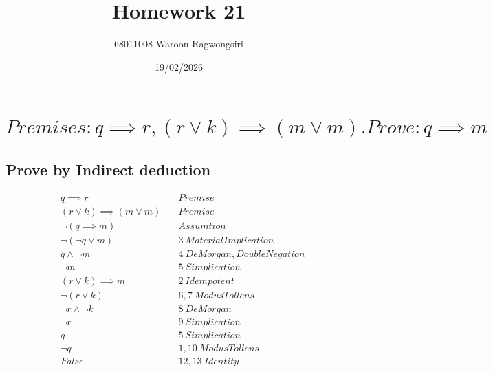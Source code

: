 \documentclass{article}
\title{Homework 21}
\author{68011008 Waroon Ragwongsiri}
\date{19/02/2026}
\begin{document}
\maketitle

{\small
\section{$Premises: q \implies r , (r \lor k) \implies (m \lor m). Prove: q \implies m$}
}
\subsection{Prove by Indirect deduction}
\begin{align}
	&q \implies r \quad & Premise \\
	&(r \lor k) \implies (m \lor m) \quad & Premise \\
	&\neg (q \implies m) \quad & Assumtion \\
	&\neg (\neg q \lor m) \quad & 3 \ Material Implication \\
	&q \land \neg m \quad & 4 \ De Morgan, Double Negation \\
	&\neg m \quad & 5 \ Simplication \\
	&(r \lor k) \implies m \quad & 2 \ Idempotent \\
	&\neg (r \lor k) \quad & 6,7 \ Modus Tollens \\
	&\neg r \land \neg k \quad & 8 \ De Morgan \\
	&\neg r \quad & 9 \ Simplication \\
	&q \quad & 5 \ Simplication \\
	&\neg q \quad & 1,10 \ Modus Tollens \\
	&False \quad & 12,13 \ Identity
\end{align}
\end{document}
